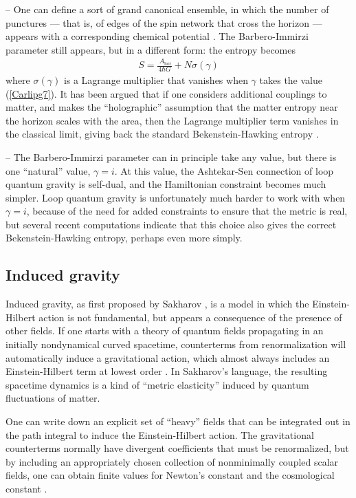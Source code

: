 \documentclass[12pt]{article}
\begin{document}
-- One can define a sort of grand canonical ensemble, in which
the number of punctures --- that is, of edges of the spin network 
that cross the horizon --- appears with a corresponding chemical 
potential \cite{Ghosh}.  The Barbero-Immirzi parameter still appears, 
but in a different form: the entropy becomes
\begin{align}
S =  \frac{\ A_{\mathrm{\scriptstyle hor}}}{4\hbar G}  + N\sigma(\gamma)
\label{Carlipg8}
\end{align}
where $\sigma(\gamma)$ is  a Lagrange multiplier that vanishes when
$\gamma$ takes the value (\ref{Carlipg7}).  It has been argued that if
one considers additional couplings to matter, and makes the
``holographic'' assumption that the matter entropy near the horizon 
scales with the area, then the Lagrange multiplier term vanishes in
the classical limit, giving back the standard Bekenstein-Hawking 
entropy \cite{Perez}.

-- The Barbero-Immirzi parameter can in principle take any value,
but there is one ``natural'' value, $\gamma=i$.  At this value, the
Ashtekar-Sen connection of loop quantum gravity is self-dual,
and the Hamiltonian constraint becomes much simpler.  Loop quantum
gravity is unfortunately much harder to work with when $\gamma=i$,
because of the need for added constraints to ensure that the metric
is real, but several recent computations \cite{Geiller,Achour,Carlip_loop}
indicate that this choice also gives the correct Bekenstein-Hawking
entropy, perhaps even more simply.

\subsection{Induced gravity}

Induced gravity, as first proposed by Sakharov \cite{Sakharov},
is a model in which the Einstein-Hilbert action is not fundamental,
but appears a consequence of the presence of other fields.  If one starts with 
a theory of quantum fields propagating in an initially nondynamical
curved spacetime, counterterms from renormalization will automatically 
induce a gravitational action, which almost always includes an 
Einstein-Hilbert term at lowest order \cite{Adler}.  In Sakharov's
language, the resulting spacetime dynamics is a kind of 
``metric elasticity'' induced by quantum fluctuations of matter.

One can write down an explicit set of ``heavy'' fields that 
can be integrated out in the path integral to induce the Einstein-Hilbert 
action.  The gravitational counterterms normally have divergent
coefficients that must be renormalized, but by including an
appropriately chosen collection of nonminimally coupled scalar fields, 
one can obtain finite values for Newton's constant and the 
cosmological constant \cite{Frolovx}.  
\end{document}

